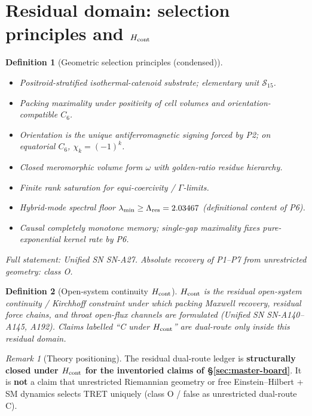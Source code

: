 \documentclass[11pt,a4paper]{article}
\newtheorem{definition}{Definition}
\theoremstyle{remark}
\newtheorem{remark}{Remark}
\begin{document}
\section{Residual domain: selection principles and $H_{\rm cont}$}
\label{sec:domain}

\begin{definition}[Geometric selection principles (condensed)]
\label{def:P}
\begin{itemize}[leftmargin=1.4em]
\item[\textbf{P1}] Positroid-stratified isothermal-catenoid substrate; elementary unit $\mathcal{S}_{15}$.
\item[\textbf{P2}] Packing maximality under positivity of cell volumes and orientation-compatible $C_6$.
\item[\textbf{P3}] Orientation is the unique antiferromagnetic signing forced by P2; on equatorial $C_6$, $\chi_k=(-1)^k$.
\item[\textbf{P4}] Closed meromorphic volume form $\omega$ with golden-ratio residue hierarchy.
\item[\textbf{P5}] Finite rank saturation for equi-coercivity / $\Gamma$-limits.
\item[\textbf{P6}] Hybrid-mode spectral floor $\lambda_{\min}\ge\Lambda_{\rm res}=2.03467$ (definitional content of P6).
\item[\textbf{P7}] Causal completely monotone memory; single-gap maximality fixes pure-exponential kernel rate by P6.
\end{itemize}
Full statement: Unified SN SN-A27. Absolute recovery of P1--P7 from unrestricted geometry: class O.
\end{definition}

\begin{definition}[Open-system continuity $H_{\rm cont}$]
\label{def:Hcont}
$H_{\rm cont}$ is the residual open-system continuity / Kirchhoff constraint under which packing Maxwell recovery, residual force chains, and throat open-flux channels are formulated (Unified SN SN-A140--A145, A192). Claims labelled ``C under $H_{\rm cont}$'' are dual-route only inside this residual domain.
\end{definition}

\begin{remark}[Theory positioning]
The residual dual-route ledger is \textbf{structurally closed under $H_{\rm cont}$ for the inventoried claims of \S\ref{sec:master-board}}.
It is \textbf{not} a claim that unrestricted Riemannian geometry or free Einstein--Hilbert + SM dynamics selects TRET uniquely (class O / false as unrestricted dual-route C).
\end{remark}
\end{document}
